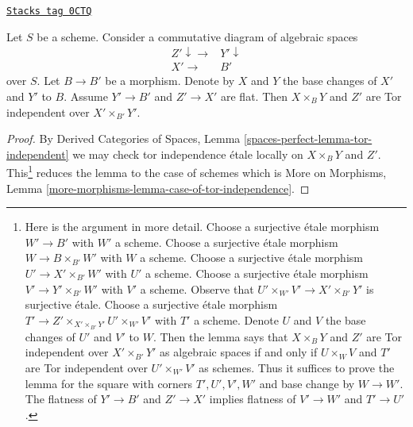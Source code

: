 \begin{lemma}
\label{spaces-more-morphisms-lemma-case-of-tor-independence}
\href{https://stacks.math.columbia.edu/tag/0CTQ}{\texttt{Stacks tag 0CTQ}}

Let $S$ be a scheme. Consider a commutative diagram of algebraic spaces
$$
\begin{array}{cc}Z' \downarrow\longrightarrow & Y' \downarrow \\ X' \longrightarrow & B'\end{array}
$$
over $S$.
Let $B \to B'$ be a morphism. Denote by $X$ and $Y$ the base
changes of $X'$ and $Y'$ to $B$.
Assume $Y' \to B'$ and $Z' \to X'$ are flat.
Then $X \times_B Y$ and $Z'$ are Tor independent over $X' \times_{B'} Y'$.
\end{lemma}

\begin{proof}
By Derived Categories of Spaces, Lemma
\ref{spaces-perfect-lemma-tor-independent}
we may check tor independence \'etale locally on $X \times_B Y$
and $Z'$. This\footnote{Here is the argument in more detail.
Choose a surjective \'etale morphism $W' \to B'$
with $W'$ a scheme. Choose a surjective \'etale morphism
$W \to B \times_{B'} W'$ with $W$ a scheme. Choose a
surjective \'etale morphism
$U' \to X' \times_{B'} W'$ with $U'$ a scheme. Choose a
surjective \'etale morphism $V' \to Y' \times_{B'} W'$ with $V'$ a scheme.
Observe that $U' \times_{W'} V' \to X' \times_{B'} Y'$ is surjective
\'etale. Choose a surjective \'etale morphism
$T' \to Z' \times_{X' \times_{B'} Y'} U' \times_{W'} V'$
with $T'$ a scheme. Denote $U$ and $V$ the base changes of $U'$ and $V'$
to $W$. Then the lemma says that $X \times_B Y$ and $Z'$
are Tor independent over $X' \times_{B'} Y'$ as algebraic spaces
if and only if $U \times_W V$ and $T'$ are Tor independent over
$U' \times_{W'} V'$ as schemes. Thus
it suffices to prove the lemma for
the square with corners $T', U', V', W'$ and base change by $W \to W'$.
The flatness of $Y' \to B'$ and $Z' \to X'$ implies flatness
of $V' \to W'$ and $T' \to U'$.}
reduces the lemma to the case of schemes
which is More on Morphisms, Lemma
\ref{more-morphisms-lemma-case-of-tor-independence}.
\end{proof}


